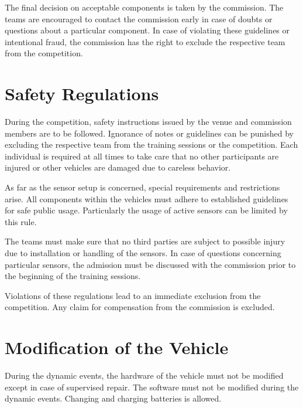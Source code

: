 The final decision on acceptable components is taken by the commission. The
teams are encouraged to contact the commission early in case of doubts or
questions about a particular component. In case of violating these guidelines
or intentional fraud, the commission has the right to exclude the respective
team from the competition.

\section{Safety Regulations}

During the competition, safety instructions issued by the venue and commission
members are to be followed. Ignorance of notes or guidelines can be punished by
excluding the respective team from the training sessions or the competition.
Each individual is required at all times to take care that no other
participants are injured or other vehicles are damaged due to careless
behavior.

As far as the sensor setup is concerned, special requirements and restrictions
arise. All components within the vehicles must adhere to established guidelines
for safe public usage. Particularly the usage of active sensors can be limited
by this rule.

The teams must make sure that no third parties are subject to possible injury
due to installation or handling of the sensors. In case of questions concerning
particular sensors, the admission must be discussed with the commission prior
to the beginning of the training sessions.

Violations of these regulations lead to an immediate exclusion from the
competition. Any claim for compensation from the commission is excluded.

\section{Modification of the Vehicle}

During the dynamic events, the hardware of the vehicle must not be modified
except in case of supervised repair. The software must not be modified during
the dynamic events. Changing and charging batteries is allowed.